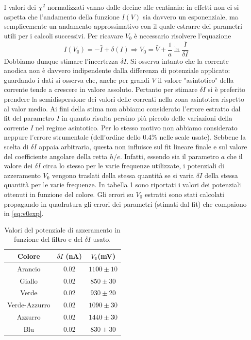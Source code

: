 \documentclass[10pt,a4paper]{article}
\begin{document}
I valori dei $\chi^2$ normalizzati vanno dalle decine alle centinaia: in effetti non ci si aspetta che l'andamento della funzione $I(V)$ sia davvero un esponenziale, ma semplicemente un andamento approssimativo con il quale estrarre dei parametri utili per i calcoli successivi.
Per ricavare $V_0$ è necessario risolvere l'equazione
\begin{equation}\label{eq:v0exp}
I(V_0)=-\bar{I}+\delta(I)\Rightarrow V_0=\bar{V}+\frac{1}{a}\ln\frac{\bar{I}}{\delta I}
\end{equation} 
Dobbiamo dunque stimare l'incertezza $\delta I$. 
Si osserva intanto che la corrente anodica non è davvero indipendente dalla differenza di potenziale applicato: guardando i dati si osserva che, anche per grandi $V$ il valore "asintotico" della corrente tende a crescere in valore assoluto.
Pertanto per stimare $\delta I$ si è preferito prendere la semidispersione dei valori delle correnti nella zona asintotica rispetto al valor medio.
Ai fini della stima non abbiamo considerato l'errore estratto dal fit del parametro $\bar{I}$ in quanto risulta persino più piccolo delle variazioni della corrente $I$ nel regime asintotico.
Per lo stesso motivo non abbiamo considerato neppure l'errore strumentale (dell'ordine dello 0.4\% nelle scale usate).
Sebbene la scelta di $\delta I$ appaia arbitraria, questa non influisce sul fit lineare finale e sul valore del coefficiente angolare della retta $h/e$. Infatti, essendo sia il parametro $a$ che il valore dei $\delta I$ circa lo stesso per le varie frequenze utilizzate, i potenziali di azzeramento $V_0$ vengono traslati della stessa quantità se si varia $\delta I$ della stessa quantità per le varie frequenze.
In tabella \ref{tab:V_0} sono riportati i valori dei potenziali ottenuti in funzione del colore. Gli errori su $V_0$ estratti sono stati calcolati propagando in quadratura gli errori dei parametri (stimati dal fit) che compaiono in \ref{eq:v0exp}.
\begin{table}[!htb]
\centering
\begin{tabular}{|c|c|c|}
\hline
Colore & $\delta I$ (nA) & $V_{0}$(mV)\\
\hline
Arancio & 0.02 & $1100\pm 10$\\
\hline
Giallo & 0.02 & $850 \pm 30$\\
\hline
Verde & 0.02 & $930 \pm 20$\\
\hline
Verde-Azzurro & 0.02 & $1090\pm 30$ \\
\hline
Azzurro & 0.02 & $1440 \pm 30$\\
\hline
Blu & 0.02 & $830 \pm 30$\\
\hline
\end{tabular}
\caption{Valori del potenziale di azzeramento in funzione del filtro e del $\delta I$ usato.\label{tab:V_0}}
\end{table}
\end{document}
